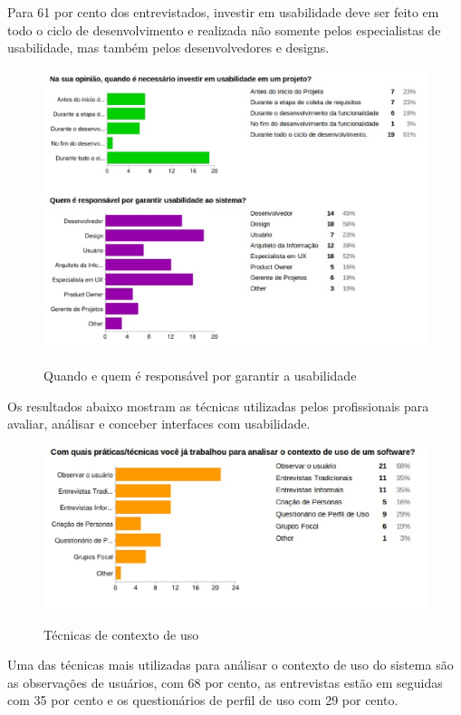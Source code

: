 	Para 61 por cento dos entrevistados, investir em usabilidade deve ser feito em todo o ciclo de desenvolvimento e realizada não somente pelos especialistas de usabilidade, mas também pelos desenvolvedores e designs. 
		
	\begin{figure}[!h]
    	\centering
    	\includegraphics[keepaspectratio=true,scale=0.55]
      		{figuras/quando_e_quem.eps}
    	\label{concepcao}
		\caption{Quando e quem é responsável por garantir a usabilidade}
	\end{figure}

	Os resultados abaixo mostram as técnicas utilizadas pelos profissionais para avaliar, análisar e conceber interfaces com usabilidade.
	
	\begin{figure}[!h]
    	\centering
    	\includegraphics[keepaspectratio=true,scale=0.55]
      		{figuras/contexto_uso.eps}
    	\label{concepcao}
		\caption{Técnicas de contexto de uso}
	\end{figure}
	
	Uma das técnicas mais utilizadas para análisar o contexto de uso do sistema são as observações de usuários, com 68 por cento, as entrevistas estão em seguidas com 35 por cento e os questionários de perfil de uso com 29 por cento.
		
